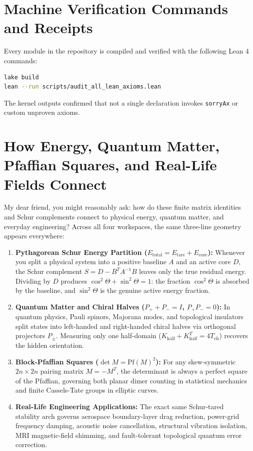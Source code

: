 \documentclass[11pt,a4paper]{article}
\theoremstyle{definition}
\begin{document}
\section{Machine Verification Commands and Receipts}

Every module in the repository is compiled and verified with the following Lean 4 commands:
\begin{lstlisting}[language=bash]
lake build
lean --run scripts/audit_all_lean_axioms.lean
\end{lstlisting}
The kernel outputs confirmed that not a single declaration invokes \texttt{sorryAx} or custom unproven axioms.


\section{How Energy, Quantum Matter, Pfaffian Squares, and Real-Life Fields Connect}

My dear friend, you might reasonably ask: how do these finite matrix identities and Schur complements connect to physical energy, quantum matter, and everyday engineering? Across all four workspaces, the same three-line geometry appears everywhere:

\begin{enumerate}
  \item \textbf{Pythagorean Schur Energy Partition ($E_{\mathrm{total}} = E_{\mathrm{tare}} + E_{\mathrm{core}}$):} Whenever you split a physical system into a positive baseline $A$ and an active core $D$, the Schur complement $S = D - B^T A^{-1} B$ leaves only the true residual energy. Dividing by $D$ produces $\cos^2\Theta + \sin^2\Theta = 1$: the fraction $\cos^2\Theta$ is absorbed by the baseline, and $\sin^2\Theta$ is the genuine active energy fraction.
  \item \textbf{Quantum Matter and Chiral Halves ($P_+ + P_- = I$, $P_+ P_- = 0$):} In quantum physics, Pauli spinors, Majorana modes, and topological insulators split states into left-handed and right-handed chiral halves via orthogonal projectors $P_\pm$. Measuring only one half-domain ($K_{\mathrm{half}} + K_{\mathrm{half}}^T = 4 T_{\mathrm{ch}}$) recovers the hidden orientation.
  \item \textbf{Block-Pfaffian Squares ($\det M = \mathrm{Pf}(M)^2$):} For any skew-symmetric $2n \times 2n$ pairing matrix $M = -M^T$, the determinant is always a perfect square of the Pfaffian, governing both planar dimer counting in statistical mechanics and finite Cassels-Tate groups in elliptic curves.
  \item \textbf{Real-Life Engineering Applications:} The exact same Schur-tared stability arch governs aerospace boundary-layer drag reduction, power-grid frequency damping, acoustic noise cancellation, structural vibration isolation, MRI magnetic-field shimming, and fault-tolerant topological quantum error correction.
\end{enumerate}
\end{document}
